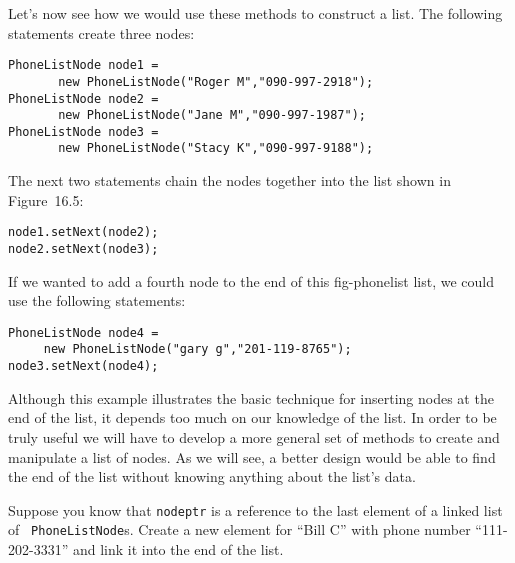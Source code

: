 Let's now see how we would use these methods to construct a list.
The following statements create three nodes:

\begin{jjjlisting}
\begin{lstlisting}
PhoneListNode node1 = 
       new PhoneListNode("Roger M","090-997-2918");
PhoneListNode node2 = 
       new PhoneListNode("Jane M","090-997-1987");
PhoneListNode node3 = 
       new PhoneListNode("Stacy K","090-997-9188");
\end{lstlisting}
\end{jjjlisting}

\noindent The next two statements chain the nodes together into
the list shown in Figure~16.5:

\begin{jjjlisting}
\begin{lstlisting}
node1.setNext(node2);
node2.setNext(node3);
\end{lstlisting}
\end{jjjlisting}

\noindent If we wanted to add a fourth node to the end of this
{fig-phonelist}
list, we could use the following statements:

\begin{jjjlisting}
\begin{lstlisting}
PhoneListNode node4 =
     new PhoneListNode("gary g","201-119-8765");
node3.setNext(node4);
\end{lstlisting}
\end{jjjlisting}

\noindent Although this example illustrates the basic technique
for inserting nodes at the end of the list, it depends too much on our
knowledge of the list.  In order to be truly useful we will have to
develop a more general set of methods to create and manipulate a list
of nodes. As we will see, a better design would be able to find
the end of the list without knowing anything about the list's data.




\pagebreak
{}
\label{self-study-exercise}
\begin{SSTUDY}

\item Suppose you know that {\tt nodeptr} is
a reference to the last element of a linked list of {\tt
PhoneList\-Node}s.  Create a new element for ``Bill C'' with phone
number ``111-202-3331'' and link it into the end of the list.
\end{SSTUDY}

